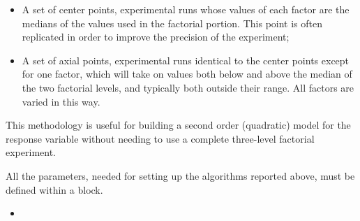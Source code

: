 \begin{itemize}
\begin{itemize}
      each having two levels;
    \item A set of center points, experimental runs whose values of each factor
      are the medians of the values used in the factorial portion.
      This point is often replicated in order to improve the precision of the
      experiment;
    \item A set of axial points, experimental runs identical to the center
      points except for one factor, which will take on values both below and
      above the median of the two factorial levels, and typically both outside
      their range.
      All factors are varied in this way.
  \end{itemize}
  This methodology is useful for building a second order (quadratic) model for
  the response variable without needing to use a complete three-level factorial
  experiment.
\end{itemize}
All the parameters, needed for setting up the algorithms reported above, must be
defined within a  block.
%
\attrIntro
\begin{itemize}
\itemsep0em
\item \nameDescription
\end{itemize}

